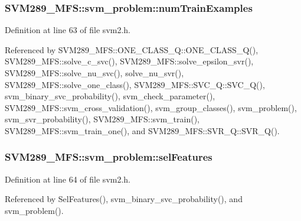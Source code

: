 \subsubsection[{\texorpdfstring{num\+Train\+Examples}{numTrainExamples}}]{ S\+V\+M289\+\_\+\+M\+F\+S\+::svm\+\_\+problem\+::num\+Train\+Examples}\hypertarget{struct_s_v_m289___m_f_s_1_1svm__problem_a16d137e053c79776e064691a20fa80ee}{}\label{struct_s_v_m289___m_f_s_1_1svm__problem_a16d137e053c79776e064691a20fa80ee}


Definition at line 63 of file svm2.\+h.



Referenced by S\+V\+M289\+\_\+\+M\+F\+S\+::\+O\+N\+E\+\_\+\+C\+L\+A\+S\+S\+\_\+\+Q\+::\+O\+N\+E\+\_\+\+C\+L\+A\+S\+S\+\_\+\+Q(), S\+V\+M289\+\_\+\+M\+F\+S\+::solve\+\_\+c\+\_\+svc(), S\+V\+M289\+\_\+\+M\+F\+S\+::solve\+\_\+epsilon\+\_\+svr(), S\+V\+M289\+\_\+\+M\+F\+S\+::solve\+\_\+nu\+\_\+svc(), solve\+\_\+nu\+\_\+svr(), S\+V\+M289\+\_\+\+M\+F\+S\+::solve\+\_\+one\+\_\+class(), S\+V\+M289\+\_\+\+M\+F\+S\+::\+S\+V\+C\+\_\+\+Q\+::\+S\+V\+C\+\_\+\+Q(), svm\+\_\+binary\+\_\+svc\+\_\+probability(), svm\+\_\+check\+\_\+parameter(), S\+V\+M289\+\_\+\+M\+F\+S\+::svm\+\_\+cross\+\_\+validation(), svm\+\_\+group\+\_\+classes(), svm\+\_\+problem(), svm\+\_\+svr\+\_\+probability(), S\+V\+M289\+\_\+\+M\+F\+S\+::svm\+\_\+train(), S\+V\+M289\+\_\+\+M\+F\+S\+::svm\+\_\+train\+\_\+one(), and S\+V\+M289\+\_\+\+M\+F\+S\+::\+S\+V\+R\+\_\+\+Q\+::\+S\+V\+R\+\_\+\+Q().

\subsubsection[{\texorpdfstring{sel\+Features}{selFeatures}}]{ S\+V\+M289\+\_\+\+M\+F\+S\+::svm\+\_\+problem\+::sel\+Features}\hypertarget{struct_s_v_m289___m_f_s_1_1svm__problem_acb97fd041d0a35f90ce7e4a906ae2a17}{}\label{struct_s_v_m289___m_f_s_1_1svm__problem_acb97fd041d0a35f90ce7e4a906ae2a17}


Definition at line 64 of file svm2.\+h.



Referenced by Sel\+Features(), svm\+\_\+binary\+\_\+svc\+\_\+probability(), and svm\+\_\+problem().

